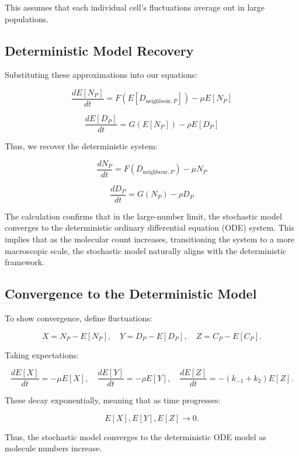 \documentclass{article}
\begin{document}
This assumes that each individual cell’s fluctuations average out in large populations.

\subsection{Deterministic Model Recovery}

Substituting these approximations into our equations:

\[
\frac{dE[N_P]}{dt} = F(E[D_{\text{neighbour},P}]) - \mu E[N_P]
\]

\[
\frac{dE[D_P]}{dt} = G(E[N_P]) - \rho E[D_P]
\]

Thus, we recover the deterministic system:

\[
\frac{dN_P}{dt} = F(D_{\text{neighbour},P}) - \mu N_P
\]

\[
\frac{dD_P}{dt} = G(N_P) - \rho D_P
\]

The calculation confirms that in the large-number limit, the stochastic model converges to the deterministic ordinary differential equation (ODE) system. This implies that as the molecular count increases, transitioning the system to a more macroscopic scale, the stochastic model naturally aligns with the deterministic framework.

\subsection{Convergence to the Deterministic Model}

To show convergence, define fluctuations:

\[
X = N_P - E[N_P], \quad Y = D_P - E[D_P], \quad Z = C_P - E[C_P].
\]

Taking expectations:

\[
\frac{dE[X]}{dt} = -\mu E[X], \quad \frac{dE[Y]}{dt} = -\rho E[Y], \quad \frac{dE[Z]}{dt} = -(k_{-1} + k_2)E[Z].
\]

These decay exponentially, meaning that as time progresses:

\[
E[X], E[Y], E[Z] \to 0.
\]

Thus, the stochastic model converges to the deterministic ODE model as molecule numbers increase.
\end{document}
